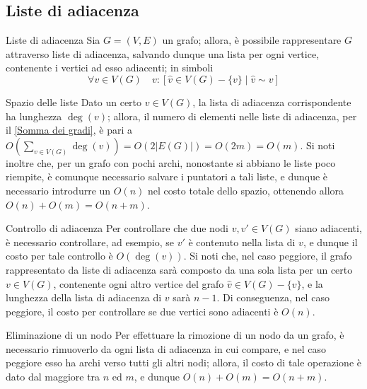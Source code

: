 \documentclass[a4paper, 12pt]{report}
\begin{document}
    \subsection{Liste di adiacenza}

    \begin{frameddefn}{Liste di adiacenza}
        Sia $G = (V, E)$ un grafo; allora, è possibile rappresentare $G$ attraverso liste di adiacenza, salvando dunque una lista per ogni vertice, contenente i vertici ad esso adiacenti; in simboli $$\forall v \in V(G) \quad v:[\hat{v} \in V(G) - \{v\} \mid \hat{v} \sim v]$$
    \end{frameddefn}

    \begin{framedobs}{Spazio delle liste}
        Dato un certo $v \in V(G)$, la lista di adiacenza corrispondente ha lunghezza $\deg(v)$; allora, il numero di elementi nelle liste di adiacenza, per il \cref{Somma dei gradi}, è pari a $\displaystyle O \left(\sum_{v \in V(G)}{\deg(v)}\right) = O\left( 2 |E(G)| \right)=O(2m) = O(m)$. Si noti inoltre che, per un grafo con pochi archi, nonostante si abbiano le liste poco riempite, è comunque necessario salvare i puntatori a tali liste, e dunque è necessario introdurre un $O(n)$ nel costo totale dello spazio, ottenendo allora $O(n) + O(m) = O(n + m)$.
    \end{framedobs}

    \begin{framedobs}{Controllo di adiacenza}
        Per controllare che due nodi $v, v' \in V(G)$ siano adiacenti, è necessario controllare, ad esempio, se $v'$ è contenuto nella lista di $v$, e dunque il costo per tale controllo è $O(\deg(v))$.
        Si noti che, nel caso peggiore, il grafo rappresentato da liste di adiacenza sarà composto da una sola lista per un certo $v \in V(G)$, contenente ogni altro vertice del grafo $\hat{v} \in V(G) - \{v\}$, e la lunghezza della lista di adiacenza di $v$ sarà $n - 1$. Di conseguenza, nel caso peggiore, il costo per controllare se due vertici sono adiacenti è $O(n)$.
    \end{framedobs}

    \begin{framedobs}{Eliminazione di un nodo}
        Per effettuare la rimozione di un nodo da un grafo, è necessario rimuoverlo da ogni lista di adiacenza in cui compare, e nel caso peggiore esso ha archi verso tutti gli altri nodi; allora, il costo di tale operazione è dato dal maggiore tra $n$ ed $m$, e dunque $O(n) + O(m) = O(n + m)$.
    \end{framedobs}
\end{document}
